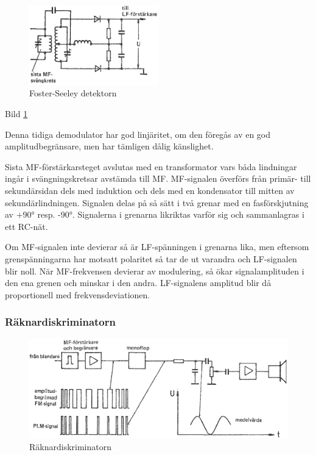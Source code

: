 \begin{figure}
\includegraphics[width=0.5\textwidth]{images/cropped_pdfs/bild_2_3-60.pdf}
\caption{Foster-Seeley detektorn}
\label{fig:BildII3-60}
\end{figure}

Bild \ref{fig:BildII3-60}

Denna tidiga demodulator har god linjäritet, om den föregås av en god
amplitudbegränsare, men har tämligen dålig känslighet.

Sista MF-förstärkarsteget avslutas med en transformator vars båda
lindningar ingår i svängningskretsar avstämda till MF. MF-signalen
överförs från primär- till sekundärsidan dels med induktion och dels
med en kondensator till mitten av sekundärlindningen. Signalen delas på
så sätt i två grenar med en fasförskjutning av +90° resp. -90°.
Signalerna i grenarna likriktas varför sig och sammanlagras i ett
RC-nät.

Om MF-signalen inte devierar så är LF-spänningen i grenarna lika, men
eftersom grenspänningarna har motsatt polaritet så tar de ut varandra
och LF-signalen blir noll.  När MF-frekvensen devierar av modulering,
så ökar signalamplituden i den ena grenen och minskar i den
andra. LF-signalens amplitud blir då proportionell med
frekvensdeviationen.

\subsubsection{Räknardiskriminatorn}

\begin{figure}
\includegraphics[width=\textwidth]{images/cropped_pdfs/bild_2_3-61.pdf}
\caption{Räknardiskriminatorn}
\label{fig:BildII3-61}
\end{figure}

